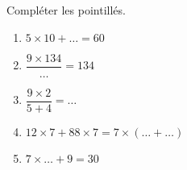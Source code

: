 
\begin{exercice}\label{exosmath-0849}

    Compléter les pointillés.
    \begin{multicols}{2}
        \begin{enumerate}
            \item
                \( 5\times 10+\ldots =60\)
            \item
                \( \dfrac{ 9\times 134 }{ \ldots }=134\)
            \item
                \( \dfrac{ 9\times 2 }{ 5+4 }=\ldots\)
            \item
                \( 12\times 7+88\times 7=7\times (\ldots+\ldots)\)
            \item
                \( 7\times \ldots+9=30\) 
        \end{enumerate}
    \end{multicols}

\end{exercice}
